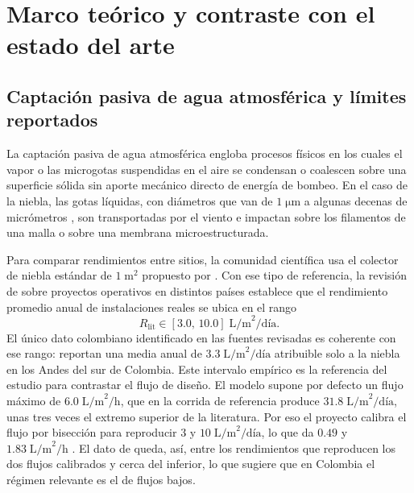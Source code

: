 \chapter{Marco te\'orico y contraste con el estado del arte}
\label{cap:marco_teorico}

\section{Captaci\'on pasiva de agua atmosf\'erica y l\'imites reportados}
\label{sec:captacion}
La captaci\'on pasiva de agua atmosf\'erica engloba procesos f\'isicos en los cuales el vapor o las microgotas suspendidas en el aire se condensan o coalescen sobre una superficie s\'olida sin aporte mec\'anico directo de energ\'ia de bombeo. En el caso de la niebla, las gotas l\'iquidas, con di\'ametros que van de $1\;\si{\micro\meter}$ a algunas decenas de micr\'ometros \parencite{klemm2012fog}, son transportadas por el viento e impactan sobre los filamentos de una malla o sobre una membrana microestructurada.

Para comparar rendimientos entre sitios, la comunidad cient\'ifica usa el colector de niebla est\'andar de $1\;\text{m}^2$ propuesto por \textcite{schemenauer1994standard}. Con ese tipo de referencia, la revisi\'on de \textcite{klemm2012fog} sobre proyectos operativos en distintos pa\'ises establece que el rendimiento promedio anual de instalaciones reales se ubica en el rango
\begin{equation}
  R_{\text{lit}} \in [3.0,\, 10.0]\;\text{L/m}^2\text{/d\'ia}.
\end{equation}
El \'unico dato colombiano identificado en las fuentes revisadas es coherente con ese rango: \textcite{molina2008fog} reportan una media anual de $3.3\;\text{L/m}^2\text{/d\'ia}$ atribuible solo a la niebla en los Andes del sur de Colombia. Este intervalo emp\'irico es la referencia del estudio para contrastar el flujo de dise\~no. El modelo supone por defecto un flujo m\'aximo de $6.0\;\text{L/m}^2\text{/h}$, que en la corrida de referencia produce $31.8\;\text{L/m}^2\text{/d\'ia}$, unas tres veces el extremo superior de la literatura. Por eso el proyecto calibra el flujo por bisecci\'on para reproducir $3$ y $10\;\text{L/m}^2\text{/d\'ia}$, lo que da $0.49$ y $1.83\;\text{L/m}^2\text{/h}$ \parencite[doc.~04, \S~8.6]{axioma2026engine}. El dato de \textcite{molina2008fog} queda, as\'i, entre los rendimientos que reproducen los dos flujos calibrados y cerca del inferior, lo que sugiere que en Colombia el r\'egimen relevante es el de flujos bajos.


